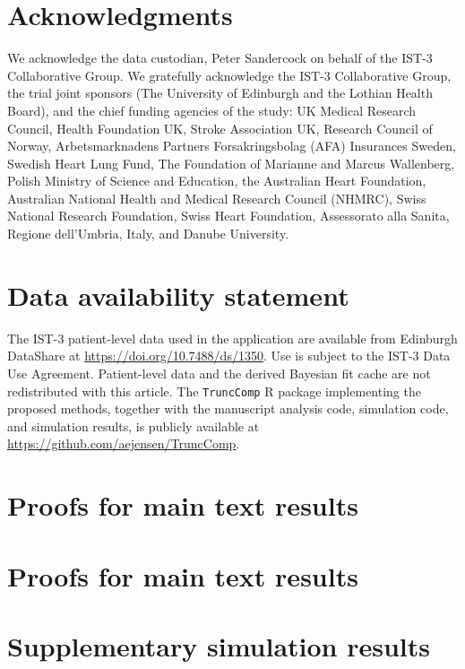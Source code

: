 \documentclass[11pt]{article}
\begin{document}
\section*{Acknowledgments}
We acknowledge the data custodian, Peter Sandercock on behalf of the IST-3 Collaborative Group. We gratefully acknowledge the IST-3 Collaborative Group, the trial joint sponsors (The University of Edinburgh and the Lothian Health Board), and the chief funding agencies of the study: UK Medical Research Council, Health Foundation UK, Stroke Association UK, Research Council of Norway, Arbetsmarknadens Partners Forsakringsbolag (AFA) Insurances Sweden, Swedish Heart Lung Fund, The Foundation of Marianne and Marcus Wallenberg, Polish Ministry of Science and Education, the Australian Heart Foundation, Australian National Health and Medical Research Council (NHMRC), Swiss National Research Foundation, Swiss Heart Foundation, Assessorato alla Sanita, Regione dell'Umbria, Italy, and Danube University.

\section*{Data availability statement}
The IST-3 patient-level data used in the application are available from Edinburgh DataShare at \url{https://doi.org/10.7488/ds/1350}. Use is subject to the IST-3 Data Use Agreement. Patient-level data and the derived Bayesian fit cache are not redistributed with this article. The \texttt{TruncComp} R package implementing the proposed methods, together with the manuscript analysis code, simulation code, and simulation results, is publicly available at \url{https://github.com/aejensen/TruncComp}.

\fi

\ifManuscriptIncludeSupplement
\clearpage
\appendix
\ifProofsExternal
\section{Proofs for main text results}\label{app:main-text-proofs}
\else\ifProofsToAppendix
\section{Proofs for main text results}\label{app:main-text-proofs}
\printProofs[mainproofs]
\fi
\fi
\section{Supplementary simulation results}\label{app:supplementary-simulation-results}
\end{document}
